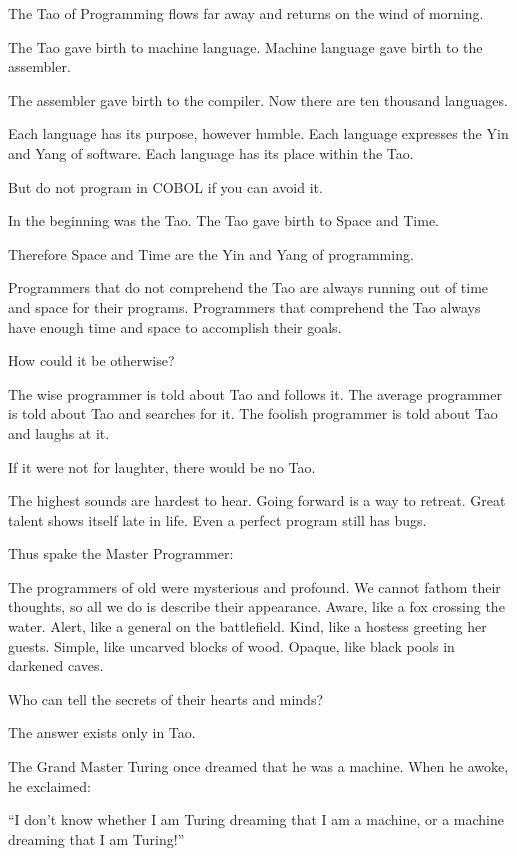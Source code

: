 The Tao of Programming flows far away and returns on the wind of morning.

The Tao gave birth to machine language. Machine language gave birth to the assembler.

The assembler gave birth to the compiler. Now there are ten thousand languages.

Each language has its purpose, however humble. Each language expresses the Yin and Yang of software. Each language has its place within the Tao.

But do not program in COBOL if you can avoid it.

In the beginning was the Tao. The Tao gave birth to Space and Time.

Therefore Space and Time are the Yin and Yang of programming.

Programmers that do not comprehend the Tao are always running out of time and space for their programs. Programmers that comprehend the Tao always have enough time and space to accomplish their goals.

How could it be otherwise?

The wise programmer is told about Tao and follows it. The average programmer is told about Tao and searches for it. The foolish programmer is told about Tao and laughs at it.

If it were not for laughter, there would be no Tao.

The highest sounds are hardest to hear. Going forward is a way to retreat. Great talent shows itself late in life. Even a perfect program still has bugs.

Thus spake the Master Programmer:

The programmers of old were mysterious and profound. We cannot fathom their thoughts, so all we do is describe their appearance.
\startverse%
Aware, like a fox crossing the water.
Alert, like a general on the battlefield.
Kind, like a hostess greeting her guests.
Simple, like uncarved blocks of wood.
Opaque, like black pools in darkened caves.
\endverse

Who can tell the secrets of their hearts and minds?

The answer exists only in Tao.

The Grand Master Turing once dreamed that he was a machine. When he awoke, he exclaimed:

``I don't know whether I am Turing dreaming that I am a machine, or a machine dreaming that I am Turing!''


